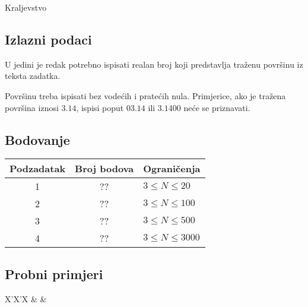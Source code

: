 \begin{statement}[
  problempoints=100,
  timelimit=1 sekunda,
  memorylimit=512 MiB,
]{Kraljevstvo}
\subsection*{Izlazni podaci}
U jedini je redak potrebno ispisati realan broj koji predstavlja traženu
površinu iz teksta zadatka.

Površinu treba ispisati bez vodećih i pratećih nula. Primjerice, ako je
tražena površina iznosi $3.14$, ispisi poput $03.14$ ili $3.1400$ neće
se priznavati.

\subsection*{Bodovanje}
{\renewcommand{\arraystretch}{1.4}
  \setlength{\tabcolsep}{6pt}
  \begin{tabular}{ccl}
 Podzadatak & Broj bodova & Ograničenja \\ \midrule
  1 & ?? & $3 \le N \le 20$ \\
  2 & ?? & $3 \le N \le 100$ \\
  3 & ?? & $3 \le N \le 500$ \\
  4 & ?? & $3 \le N \le 3000$ \\
\end{tabular}}

\subsection*{Probni primjeri}
\begin{tabularx}{\textwidth}{X'X'X}
 &
 &
\end{tabularx}


\end{statement}

